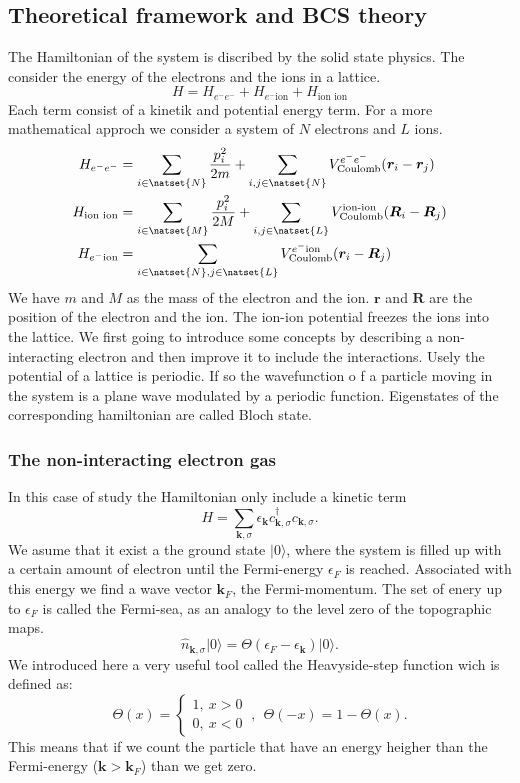 \documentclass[../main.tex]{subfile}
\begin{document}
\subsection{Theoretical framework and BCS theory}
The Hamiltonian of the system is discribed by the solid state physics. The consider the energy of the electrons and the ions in a lattice.
\[
    H = H_{e^-e^-} + H_{e^-\text{ion}} + H_{\text{ion ion}}
\]
Each term consist of a kinetik and potential energy term. For a more mathematical approch we consider a system of $N$ electrons and $L$ ions.
\begin{align*}
    H_{e^-e^-} &= \sum_{i \in \natset{N}} \frac{p_i^2}{2m} + \sum_{i,j\in\natset{N}} V_{\text{Coulomb}}^{e^-e^-}(\bm{r}_i-\bm{r}_j) \\
    H_{\text{ion ion}} &=  \sum_{i \in \natset{M}} \frac{p_i^2}{2M} + \sum_{i,j\in\natset{L}} V_{\text{Coulomb}}^{\text{ion-ion}}(\bm{R}_i-\bm{R}_j) \\
    H_{e^-\text{ion}} &= \sum_{i\in \natset{N},j\in \natset{L}} V_{\text{Coulomb}}^{e^-\text{ion}}(\bm{r}_i-\bm{R}_j)
\end{align*}
We have $m$ and $M$ as the mass of the electron and the ion. $\bm{r}$ and $\bm{R}$ are the position of the electron and the ion. The ion-ion potential
freezes the ions into the lattice. 
We first going to introduce some concepts by describing a non-interacting electron and then improve it to include the interactions.
Usely the potential of a lattice is periodic. If so the wavefunction o f a particle moving in the system is a plane wave modulated
by a periodic function. Eigenstates of the corresponding hamiltonian are called Bloch state.

\subsubsection{The non-interacting electron gas}
In this case of study the Hamiltonian only include a kinetic term
\[
    H=\sum_{\bm{k},\sigma} \epsilon_{\bm{k}} c_{\bm{k},\sigma}^{\dagger}c_{\bm{k},\sigma}.
\] 
We asume that it exist a the ground state $|0\rangle$, where the system is filled up with a certain amount of electron until the Fermi-energy $\epsilon_F$ is reached. Associated with this
energy we find a wave vector $\bm{k}_F$, the Fermi-momentum. The set of enery up to $\epsilon_F$ is called the Fermi-sea, as an analogy to the level zero of the topographic maps.
\[
    \hat{n}_{\bm{k},\sigma} |0\rangle = \Theta(\epsilon_F - \epsilon_{\bm{k}})|0\rangle.
\]
We introduced here a very useful tool called the Heavyside-step function wich is defined as: 
\begin{equation}\label{eq:Heavyside}
    \Theta(x) = \begin{cases}
        1, ~x > 0\\
        0, ~x < 0
    \end{cases} ~ , ~~ \Theta(-x) = 1 - \Theta(x).
\end{equation}
This means that if we count the particle that have an energy heigher than the Fermi-energy ($\bm{k}>\bm{k}_F$) than we get zero.\\
\end{document}
